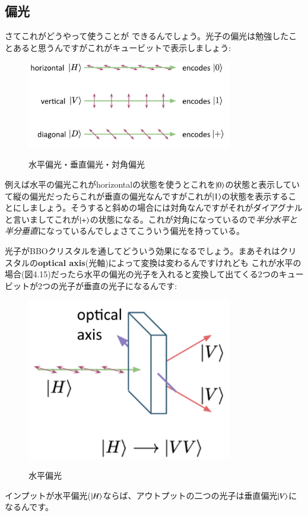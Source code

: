 \subsection{偏光}
さてこれがどうやって使うことが
できるんでしょう。光子の偏光は勉強したことあると思うんですがこれがキュービットで表示しましょう:
\begin{figure}[H]
    \centering
    \includegraphics[width=0.8\textwidth]{lesson4/linear_polarization.pdf}
    \label{fig: 1}
    \begin{center}
        \caption{水平偏光・垂直偏光・対角偏光}
    \end{center}
\end{figure}
例えば水平の偏光これがhorizontalの状態を使うとこれを$\ket{0}$の状態と表示していて縦の偏光だったらこれが垂直の偏光なんですがこれが$\ket{1}$の状態を表示することにしましょう。そうすると斜めの場合には対角なんですがそれがダイアグナルと言いましてこれが$\ket{+}$の状態になる。これが対角になっているので\textit{半分水平と半分垂直}になっているんでしょさてこういう偏光を持っている。

光子がBBOクリスタルを通してどういう効果になるでしょう。まあそれはクリスタルの\textbf{optical axis}(光軸)によって変換は変わるんですけれども
これが水平の場合(図4.15)だったら水平の偏光の光子を入れると変換して出てくる2つのキュービットが2つの光子が垂直の光子になるんです:
\begin{figure}[H]
    \centering
    \includegraphics[width=0.8\textwidth]{lesson4/horizontal_optical_axis.pdf}
    \label{fig: 1}
    \begin{center}
        \caption{水平偏光}
    \end{center}
\end{figure}
インプットが水平偏光($\ket{H}$ならば、アウトプットの二つの光子は垂直偏光$\ket{V}$になるんです。


